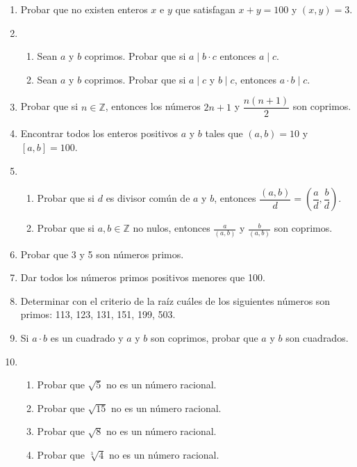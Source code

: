 \documentclass[a4paper,12pt,twoside,spanish,reqno]{amsbook}
\numberwithin{equation}{section}
\begin{document}
\begin{enumerate}
\item Probar que no existen enteros $x$ e $y$ que satisfagan $x+y=100$ y $(x,y)=3$.


\item %
\begin{enumerate}
 \item Sean $a$ y $b$ coprimos. Probar que si $a\mid b\cdot c$ entonces $a \mid c$.
 \item Sean $a$ y $b$ coprimos. Probar que si $a \mid c$ y $b \mid c$, entonces $a\cdot b \mid c$.

\end{enumerate}




\item Probar que si $n \in {\mathbb Z}$, entonces los números $2n+1$ y $\dfrac{n(n+1)}{2}$ son coprimos.




\item Encontrar todos los enteros positivos $a$ y $b$ tales que $(a,b)=10$ y $[a,b]=100$.


\item
\begin{enumerate}
\item Probar que si $d$ es divisor común de $a$ y $b$, entonces $\dfrac{(a,b)}{d} = \left(\dfrac{a}{d}, \dfrac{b}{d}\right)$.
\item Probar que si $a,b\in \mathbb Z$ no nulos, entonces  $\displaystyle \frac a{(a,b)}$ y $\displaystyle \frac b{(a,b)}$ son coprimos.
\end{enumerate}


\item Probar que 3  y 5 son números primos.


\item  Dar todos los números primos positivos menores que 100.


\item Determinar con el criterio de la raíz  cuáles de los siguientes números son primos: 113, 123, 131, 151, 199, 503.


\item Si $a\cdot b$ es un cuadrado y $a$ y $b$ son coprimos, probar que $a$ y $b$ son cuadrados.


\item 
\begin{enumerate}
    \item Probar  que $\sqrt{5}$ no es un número racional.   
    \item Probar  que $\sqrt{15}$ no es un número racional.  
    \item Probar  que $\sqrt{8}$ no es un número racional.  
    \item Probar  que $\sqrt[3]{4}$ no es un número racional.
\end{enumerate}




\end{enumerate}
\end{document}

